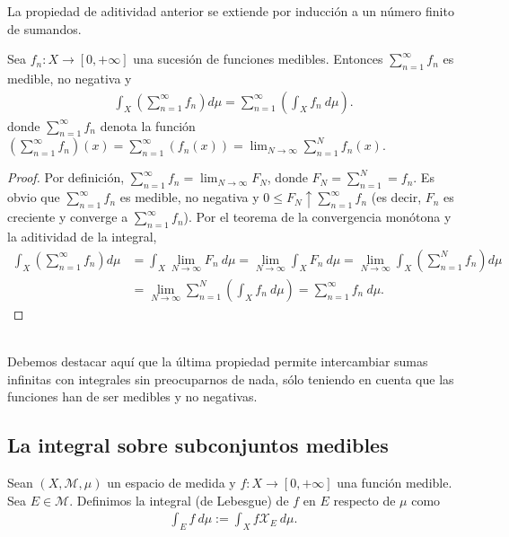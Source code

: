 \begin{obs}
La propiedad de aditividad anterior se extiende por inducción a un número finito de sumandos.
\end{obs}

\begin{prop}
\label{prop:limin}
Sea $f_n: X \to [0,+\infty]$ una sucesión de funciones medibles. Entonces $\sum_{n=1}^{\infty}{f_n}$ es medible, no negativa y
\begin{align*}
    \int_{X} \left( {\sum_{n=1}^{\infty}{f_n}} \right) d\mu = \sum_{n=1}^{\infty}{\left( \int_{X}{f_n \ d\mu} \right)}.
\end{align*}
donde $\sum_{n=1}^{\infty}{f_n}$ denota la función $\left(\sum_{n=1}^{\infty}{f_n}\right)(x) = \sum_{n=1}^{\infty}{(f_n(x))} = \lim_{N \to \infty}{\sum_{n=1}^{N}{f_n(x)}}$.
\end{prop}

\begin{proof}
Por definición, $\sum_{n=1}^{\infty}{f_n} = \lim_{N \to \infty}{F_N}$, donde $F_N = \sum_{n=1}^{N} = f_n$. Es obvio que $\sum_{n=1}^{\infty}{f_n}$ es medible, no negativa y $0 \leq F_N \uparrow \sum_{n=1}^{\infty}{f_n}$ (es decir, $F_n$ es creciente y converge a $\sum_{n=1}^{\infty}{f_n}$). Por el teorema de la convergencia monótona y la aditividad de la integral,
\begin{align*}
    \int_{X}{\left( \sum_{n=1}^{\infty}{f_n }\right) d\mu} &= \int_{X}{\lim_{N \to \infty}{F_n} \ d \mu} = \lim_{N \to \infty}{\int_{X}{F_n \ d\mu}} = \lim_{N \to \infty}{\int_{X}{\left( \sum_{n=1}^{N}{f_n} \right) d\mu}}\\
    &= \lim_{N \to \infty}{\sum_{n=1}^{N}{\left( \int_{X}{f_n \ d\mu}\right)}} = \sum_{n=1}^{\infty}{f_n \ d\mu}.
\end{align*}
\end{proof}
\\
\newline
Debemos destacar aquí que la última propiedad permite intercambiar sumas infinitas con integrales sin preocuparnos de nada, sólo teniendo en cuenta que las funciones han de ser medibles y no negativas.

\subsection{La integral sobre subconjuntos medibles}

\begin{defi}
Sean $(X, \mathcal{M}, \mu)$ un espacio de medida y $f: X \longrightarrow [0,+\infty]$ una función medible. Sea $E \in \mathcal{M}$. Definimos la integral (de Lebesgue) de $f$ en $E$ respecto de $\mu$ como
\begin{align*}
    \int_{E}{f \ d\mu} := \int_{X}{f \mathcal{X}_E \ d\mu}.
\end{align*}
\end{defi}

